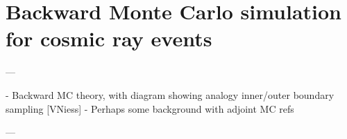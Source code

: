 \chapter{Backward Monte Carlo simulation for cosmic ray events}

\begin{markdown}
---

- Backward MC theory, with diagram showing analogy inner/outer boundary sampling [VNiess]
- Perhaps some background with adjoint MC refs

---
\end{markdown}
